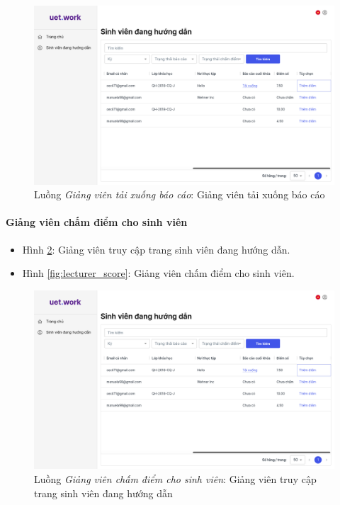\documentclass[./../main.tex]{subfiles}
\begin{document}
\begin{figure}[]
	\includegraphics[width=\linewidth]{./images/image64.png} %
	\caption{Luồng \emph{Giảng viên tải xuống báo cáo}: Giảng viên tải xuống báo cáo}
	\label{fig:lecturer_download_report}
\end{figure}

\paragraph*{Giảng viên chấm điểm cho sinh viên}

\begin{itemize}
	\item Hình \ref{fig:lecturer_access_students_page}: Giảng viên truy cập trang sinh viên đang hướng dẫn. 
	\item Hình \ref{fig:lecturer_score}: Giảng viên chấm điểm cho sinh viên.
\end{itemize}

\begin{figure}[]
	\includegraphics[width=\linewidth]{./images/image64.png}
	\caption{Luồng \emph{Giảng viên chấm điểm cho sinh viên}: Giảng viên truy cập trang sinh viên đang hướng dẫn}
	\label{fig:lecturer_access_students_page}
\end{figure}
\end{document}
